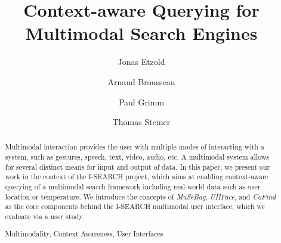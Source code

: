 \documentclass[runningheads,a4paper]{llncs} \usepackage[utf8]{inputenc}
\newcommand{\keywords}[1]{\par\addvspace\baselineskip
\noindent\keywordname\enspace\ignorespaces#1}
\begin{document}
\mainmatter  %

\title{Context-aware Querying for\\ Multimodal Search Engines}


\author{Jonas Etzold \and Arnaud Brousseau \and Paul Grimm \and Thomas Steiner}



\maketitle

\begin{abstract}
Multimodal interaction provides the user with multiple modes of interacting with
a system, such as gestures, speech, text, video, audio, etc. A multimodal system allows for several distinct means for input and output of data. In this paper, we present our work in the context of the \mbox{I-SEARCH} project, which aims at enabling context-aware querying of a multimodal search framework including real-world data such as user location or temperature. We introduce the concepts of \emph{MuSeBag}, \emph{UIIFace}, and \emph{CoFind} as the core components behind the \mbox{I-SEARCH} multimodal user interface, which we evaluate via a user study. 

\keywords{Multimodality, Context Awareness, User Interfaces}
\end{abstract}
\end{document}
